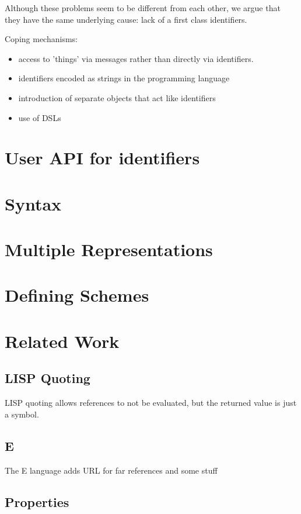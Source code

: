 \documentclass[preprint,authoryear,10pt]{sigplanconf}
\begin{document}
Although these problems seem to be different from each other, we argue that they
have the same underlying cause:   lack of a first class identifiers.  

Coping mechanisms:  
\begin{itemize}
\item access to 'things' via messages rather than directly via identifiers.  
\item identifiers encoded as strings in the programming language
\item introduction of separate objects that act like identifiers
\item use of DSLs
\end{itemize}


\section{User API for identifiers}

\section{Syntax}

\section{Multiple Representations}

\section{Defining Schemes}


\section{Related Work}

\subsection{LISP Quoting}

LISP quoting allows references to not be evaluated, but the returned value is just a symbol.

\subsection{E}

The E language adds URL for far references and some stuff

\subsection{Properties}
\end{document}
